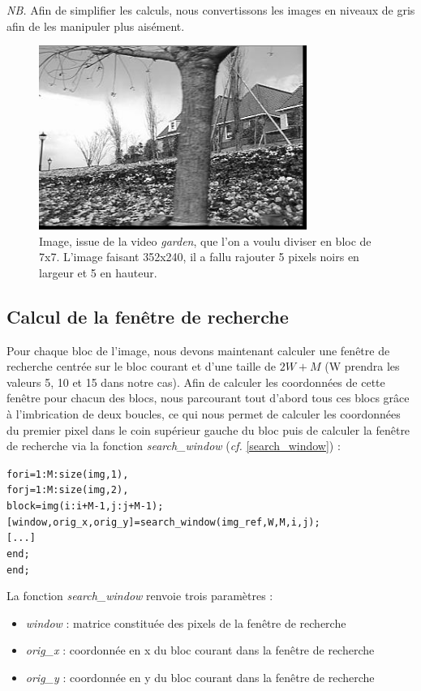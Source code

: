 \documentclass[a4paper, 12pt]{article}
\begin{document}
\textit{NB.} Afin de simplifier les calculs, nous convertissons les images en niveaux de gris afin de les manipuler plus aisément.

\begin{figure}[H]
	\centering
		\includegraphics[height=6cm]{../Resultats/Garden/garden_padding.jpg}
	\caption{Image, issue de la video \textit{garden}, que l'on a voulu diviser en bloc de 7x7. L'image faisant 352x240, il a fallu rajouter 5 pixels noirs en largeur et 5 en hauteur.}
	\label{fig:padding}
\end{figure}

\subsection{Calcul de la fenêtre de recherche}

Pour chaque bloc de l'image, nous devons maintenant calculer une fenêtre de recherche centrée sur le bloc courant et d'une taille de $2W+M$ (W prendra les valeurs 5, 10 et 15 dans notre cas). Afin de calculer les coordonnées de cette fenêtre pour chacun des blocs, nous parcourant tout d'abord tous ces blocs grâce à l'imbrication de deux boucles, ce qui nous permet de calculer les coordonnées du premier pixel dans le coin supérieur gauche du bloc puis de calculer la fenêtre de recherche via la fonction \textit{search\_window} (\textit{cf.} \ref{search_window}) :
\begin{alltt} 
for i=1:M:size(img,1), 
	for j=1:M:size(img,2),
		block = img(i:i+M-1,j:j+M-1);
		[window, orig_x, orig_y] = search_window(img_ref,W,M,i,j);
		[...]
	end;
end;
\end{alltt}

La fonction \textit{search\_window} renvoie trois paramètres : 
\begin{itemize}
  \item \textit{window} : matrice constituée des pixels de la fenêtre de recherche
  \item \textit{orig\_x} : coordonnée en x du bloc courant dans la fenêtre de recherche
  \item \textit{orig\_y} : coordonnée en y du bloc courant dans la fenêtre de recherche
\end{itemize}
\end{document}
